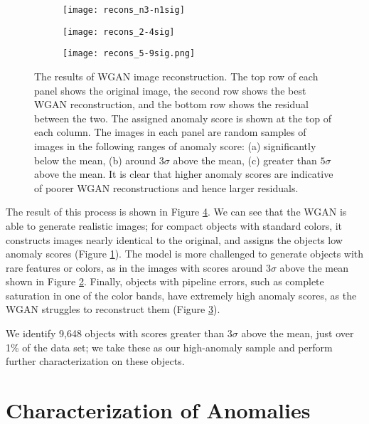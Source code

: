 \documentclass{article}
\begin{document}
\begin{figure}[t!]
\begin{subfigure}{.325\textwidth}
  \centering
  \texttt{[image: recons\_n3-n1sig]}  
  \caption{}
  \label{fig:recon_neg}
\end{subfigure}
\hfill
\begin{subfigure}{.325\textwidth}
  \centering
  \texttt{[image: recons\_2-4sig]}  
  \caption{}
  \label{fig:recon_3sig}
\end{subfigure}
\hfill
\begin{subfigure}{.325\textwidth}
  \centering
  \texttt{[image: recons\_5-9sig.png]}
  \caption{}
  \label{fig:recon_5sig}
\end{subfigure}
\caption{The results of WGAN image reconstruction. The top row of each panel shows the original image, the second row shows the best WGAN reconstruction, and the bottom row shows the residual between the two. The assigned anomaly score is shown at the top of each column. The images in each panel are random samples of images in the following ranges of anomaly score: (a) significantly below the mean, (b) around $3\sigma$ above the mean, (c) greater than $5\sigma$ above the mean. It is clear that higher anomaly scores are indicative of poorer WGAN reconstructions and hence larger residuals.}
\label{fig:recon}
\end{figure}

The result of this process is shown in Figure \ref{fig:recon}.
We can see that the WGAN is able to generate realistic images; for compact objects with standard colors, it constructs images nearly identical to the original, and assigns the objects low anomaly scores (Figure \ref{fig:recon_neg}).
The model is more challenged to generate objects with rare features or colors, as in the images with scores around $3\sigma$ above the mean shown in Figure \ref{fig:recon_3sig}.
Finally, objects with pipeline errors, such as complete saturation in one of the color bands, have extremely high anomaly scores, as the WGAN struggles to reconstruct them (Figure \ref{fig:recon_5sig}).

We identify 9,648 objects with scores greater than 3$\sigma$ above the mean, just over 1\% of the data set; we take these as our high-anomaly sample and perform further characterization on these objects.


\section{Characterization of Anomalies}
\end{document}
